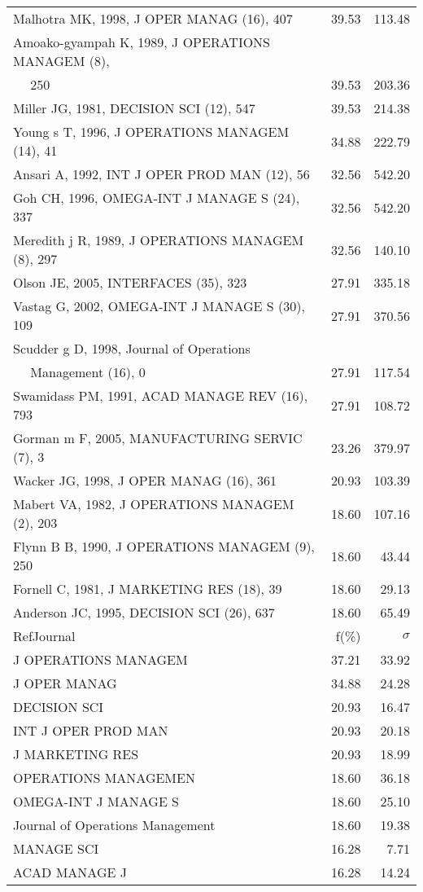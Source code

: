 \documentclass[a4paper,11pt]{report}
\begin{document}
\begin{landscape}
\begin{table}[!ht]
{\begin{tabular}{|l r r|}
Malhotra MK, 1998, J OPER MANAG (16), 407 & 39.53 & 113.48\\
Amoako-gyampah K, 1989, J OPERATIONS MANAGEM (8), &  & \\
$\quad$ 250 & 39.53 & 203.36\\
Miller JG, 1981, DECISION SCI (12), 547 & 39.53 & 214.38\\
Young s T, 1996, J OPERATIONS MANAGEM (14), 41 & 34.88 & 222.79\\
Ansari A, 1992, INT J OPER PROD MAN (12), 56 & 32.56 & 542.20\\
Goh CH, 1996, OMEGA-INT J MANAGE S (24), 337 & 32.56 & 542.20\\
Meredith j R, 1989, J OPERATIONS MANAGEM (8), 297 & 32.56 & 140.10\\
Olson JE, 2005, INTERFACES (35), 323 & 27.91 & 335.18\\
Vastag G, 2002, OMEGA-INT J MANAGE S (30), 109 & 27.91 & 370.56\\
Scudder g D, 1998, Journal of Operations &  & \\
$\quad$ Management (16), 0 & 27.91 & 117.54\\
Swamidass PM, 1991, ACAD MANAGE REV (16), 793 & 27.91 & 108.72\\
Gorman m F, 2005, MANUFACTURING SERVIC (7), 3 & 23.26 & 379.97\\
Wacker JG, 1998, J OPER MANAG (16), 361 & 20.93 & 103.39\\
Mabert VA, 1982, J OPERATIONS MANAGEM (2), 203 & 18.60 & 107.16\\
Flynn B B, 1990, J OPERATIONS MANAGEM (9), 250 & 18.60 & 43.44\\
Fornell C, 1981, J MARKETING RES (18), 39 & 18.60 & 29.13\\
Anderson JC, 1995, DECISION SCI (26), 637 & 18.60 & 65.49\\
\hline
\hline
RefJournal & f(\%) & $\sigma$\\
\hline
J OPERATIONS MANAGEM & 37.21 & 33.92\\
J OPER MANAG & 34.88 & 24.28\\
DECISION SCI & 20.93 & 16.47\\
INT J OPER PROD MAN & 20.93 & 20.18\\
J MARKETING RES & 20.93 & 18.99\\
OPERATIONS MANAGEMEN & 18.60 & 36.18\\
OMEGA-INT J MANAGE S & 18.60 & 25.10\\
Journal of Operations Management & 18.60 & 19.38\\
MANAGE SCI & 16.28 & 7.71\\
ACAD MANAGE J & 16.28 & 14.24\\
\hline
\end{tabular}
}
\end{table}

\end{landscape}
\end{document}
